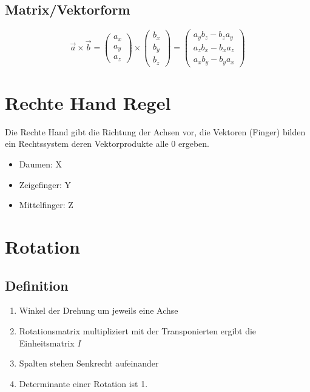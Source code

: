\subsection{Matrix/Vektorform}

\begin{equation}
\vec{a} \times \vec{b} = 
\left(
\begin{array}{c}
a_{x} \\
a_{y} \\
a_{z}
\end{array}
\right)
\times
\left(
\begin{array}{c}
b_{x} \\
b_{y} \\
b_{z}				
\end{array}
\right)
= 
\left(
\begin{array}{c}
a_{y}b_{z} - b_{z}a_{y} \\
a_{z}b_{x} - b_{x}a_{z} \\
a_{x}b_{y} - b_{y}a_{x}  
\end{array}
\right)				
\end{equation}

\section{Rechte Hand Regel}
\label{chp:MathematischeGrundlagen:sec:RechteHandRegel}
	Die Rechte Hand gibt die Richtung der Achsen vor, die Vektoren (Finger) bilden ein Rechtssystem deren Vektorprodukte alle 0 ergeben.
	\begin{itemize}
		\item Daumen: X
		\item Zeigefinger: Y
		\item Mittelfinger: Z
	\end{itemize}


\section{Rotation}
\label{chp:MathematischeGrundlagen:sec:Rotation}

\subsection{Definition}
\begin{enumerate}
	\item Winkel der Drehung um jeweils eine Achse
	\item Rotationsmatrix multipliziert mit der Transponierten ergibt die Einheitsmatrix $I$
	\item Spalten stehen Senkrecht aufeinander
	\item Determinante einer Rotation ist 1.
\end{enumerate}

